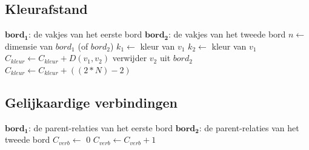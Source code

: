 \documentclass{article}
\begin{document}
\subsection{Kleurafstand}
\begin{minipage}{\linewidth}
  \vspace{-\baselineskip}
\begin{algorithm}[H]
\begin{algorithmic}[1]
 \State $\mathbf{bord_1}$: {de vakjes van het eerste bord}
 \State $\mathbf{bord_2}$: {de vakjes van het tweede bord}
 \State $n \gets$ dimensie van $bord_1$ (of $bord_2$)
 	\State $k_1 \gets$ kleur van \textit{$v_1$} 
 		\State$k_2 \gets$ kleur van \textit{$v_1$} 
   			\State $C_{kleur} \gets C_{kleur} + D(v_1, v_2)$
   			\State verwijder $v_2$ uit $bord_2$
   		\Else
   			\State $C_{kleur} \gets C_{kleur} + ((2*N)-2)$ 
  		\EndIf
  	\EndFor
  \EndFor
  \end{algorithmic}
  \end{algorithm}
  \end{minipage}
  
  \subsection{Gelijkaardige verbindingen}
    \begin{minipage}{\linewidth}
  \vspace{-\baselineskip}
\begin{algorithm}[H]
\begin{algorithmic}[1]
 \State $\mathbf{bord_1}$: {de parent-relaties van het eerste bord}
 \State $\mathbf{bord_2}$: {de parent-relaties van het tweede bord}
 \State $C_{verb} \gets$ 0
  		\If{[($x_2 = x_1$ en $y_2 = y_1$ en $ x_{v2} = x_{v1}$ en $ y_{v2} = y_{v1}$)\\\hspace*{4mm} \textbf{\textit{of}} ($x_2 = x_1 + x_{v1} $ en $y_2 = y_1 + y_{v1}$ en $ x_{v2} = -x_{v1}$ \hspace*{9mm}en $ y_{v2} = -y_{v1}$)]   }
   			\State $C_{verb} \gets C_{verb} + 1$
  		\EndIf
  	\EndFor
  \EndFor
  \end{algorithmic}
  \end{algorithm}
  \end{minipage}
  
\end{document}
